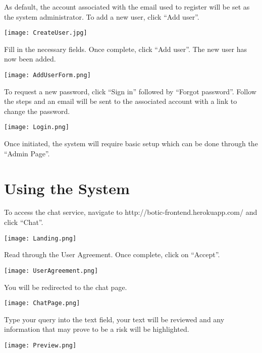 \documentclass[11pt]{article}
\begin{document}
\begin{flushleft}
	As default, the account associated with the email used to register will be set as the system administrator. To add a new user, click “Add user”.
\end{flushleft}
\texttt{[image: CreateUser.jpg]}

\begin{flushleft}
	Fill in the necessary fields. Once complete, click “Add user”. The new user has now been added.
\end{flushleft}
\texttt{[image: AddUserForm.png]}

\begin{flushleft}
	To request a new password, click “Sign in” followed by “Forgot password”. Follow the steps and an email will be sent to the associated account with a link to change the password.
\end{flushleft}
\texttt{[image: Login.png]}

\begin{flushleft}
	Once initiated, the system will require basic setup which can be done through the “Admin Page”.
\end{flushleft}

\section{Using the System}
\begin{flushleft}
	To access the chat service, navigate to http://botic-frontend.herokuapp.com/ and click “Chat”.
\end{flushleft}
\texttt{[image: Landing.png]}

\begin{flushleft}
	Read through the User Agreement. Once complete, click on “Accept”.
\end{flushleft}
\texttt{[image: UserAgreement.png]}

\begin{flushleft}
	You will be redirected to the chat page.
\end{flushleft}
\texttt{[image: ChatPage.png]}

\begin{flushleft}
	Type your query into the text field, your text will be reviewed and any information that may prove to be a risk will be highlighted.
\end{flushleft}
\texttt{[image: Preview.png]}
\end{document}

